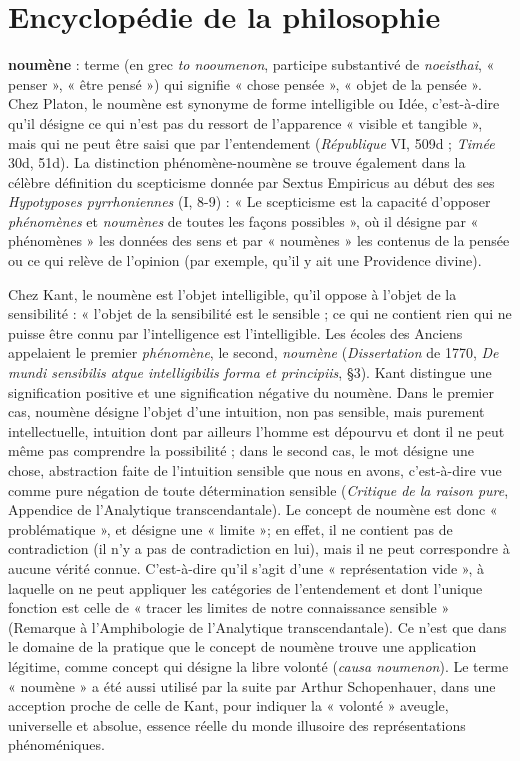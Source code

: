 
\section{Encyclopédie de la philosophie}
{\bf noumène} : terme (en grec {\it to nooumenon},
participe substantivé de {\it noeisthai}, « penser »,
« être pensé ») qui signifie « chose
pensée », « objet de la pensée ». Chez Platon,
le noumène est synonyme de forme
intelligible ou Idée, c’est-à-dire qu’il
désigne ce qui n’est pas du ressort de l’apparence
« visible et tangible », mais qui ne
peut être saisi que par l’entendement
({\it République} VI, 509d ; {\it Timée} 30d, 51d).
La distinction phénomène-noumène se
trouve également dans la célèbre définition
du scepticisme donnée par Sextus
Empiricus au début des ses {\it Hypotyposes
pyrrhoniennes} (I, 8-9) : « Le scepticisme
est la capacité d’opposer {\it phénomènes} et
{\it noumènes} de toutes les façons possibles »,
où il désigne par « phénomènes » les données
des sens et par « noumènes » les
contenus de la pensée ou ce qui relève de
l'opinion (par exemple, qu’il y ait une
Providence divine).

Chez Kant, le noumène est l’objet intelligible,
qu’il oppose à l’objet de la sensibilité :
« l’objet de la sensibilité est le
sensible ; ce qui ne contient rien qui ne
puisse être connu par l'intelligence est
l’intelligible. Les écoles des Anciens
appelaient le premier {\it phénomène}, le
second, {\it noumène} ({\it Dissertation} de 1770,
{\it De mundi sensibilis atque intelligibilis
forma et principiis}, \S 3). Kant distingue
une signification positive et une signification
négative du noumène. Dans le premier cas,
noumène désigne l’objet d’une
intuition, non pas sensible, mais purement
intellectuelle, intuition dont par ailleurs
l’homme est dépourvu et dont il ne peut
même pas comprendre la possibilité ; dans
le second cas, le mot désigne une chose,
abstraction faite de l'intuition sensible
que nous en avons, c’est-à-dire vue
comme pure négation de toute détermination
sensible ({\it Critique de la raison pure},
Appendice de l’Analytique transcendantale).
Le concept de noumène est donc
« problématique », et désigne une « limite »;
en effet, il ne contient pas de
contradiction (il n’y a pas de contradiction en lui),
mais il ne peut correspondre
à aucune vérité connue. C’est-à-dire qu’il
s’agit d’une « représentation vide », à
laquelle on ne peut appliquer les catégories
de l’entendement et dont l'unique
fonction est celle de « tracer les limites de
notre connaissance sensible » (Remarque
à l’Amphibologie de l’Analytique transcendantale).
Ce n’est que dans le domaine
de la pratique que le concept de noumène
trouve une application légitime, comme
concept qui désigne la libre volonté
({\it causa noumenon}). Le terme « noumène »
a été aussi utilisé par la suite par
Arthur Schopenhauer, dans une acception
proche de celle de Kant, pour indiquer
la « volonté » aveugle, universelle et
absolue, essence réelle du monde illusoire
des représentations phénoméniques.

